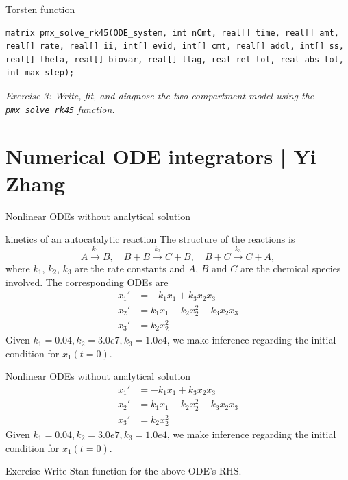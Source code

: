 \documentclass[presentation, allowframebreaks]{beamer}
\begin{document}
\begin{frame}[fragile,label={sec:org101ff93}]{Torsten function}
 \begin{verbatim}
matrix pmx_solve_rk45(ODE_system, int nCmt, real[] time, real[] amt, real[] rate, real[] ii, int[] evid, int[] cmt, real[] addl, int[] ss, real[] theta, real[] biovar, real[] tlag, real rel_tol, real abs_tol, int max_step);
\end{verbatim}
\emph{\textcolor{MRGGreen}{Exercise 3}: Write, fit, and diagnose the two compartment model using the \texttt{pmx\_solve\_rk45} function.}
\end{frame}

\section{Numerical ODE integrators | \footnotesize{Yi Zhang}}
\label{sec:orgcd8fdf4}
\label{org575bd5d}
\begin{frame}[label={sec:org028bc6a}]{Nonlinear ODEs without analytical solution}
\begin{block}{kinetics of an autocatalytic reaction \cite{robertson_numerical_1966}}
The structure of the reactions is 
\begin{equation*}
A \xrightarrow{k_1} B,\quad
B+B \xrightarrow{k_2} C + B,\quad
B+C \xrightarrow{k_3} C + A,
\end{equation*}
where \(k_1\), \(k_2\), \(k_3\) are the rate
constants and \(A\), \(B\) and \(C\) are the chemical species
involved. The corresponding ODEs are
\begin{align*}
x_1' &= -k_1x_1 + k_3x_2x_3\\
x_2' &=  k_1x_1 - k_2x_2^2 - k_3x_2x_3\\
x_3' &=  k_2x_2^2
\end{align*}
Given \(k_1=0.04, k_2=3.0e7, k_3=1.0e4\), we make inference
regarding the initial condition for \(x_1(t=0)\).
\end{block}
\end{frame}
\begin{frame}[label={sec:orgc85afde}]{Nonlinear ODEs without analytical solution}
\begin{align*}
x_1' &= -k_1x_1 + k_3x_2x_3\\
x_2' &=  k_1x_1 - k_2x_2^2 - k_3x_2x_3\\
x_3' &=  k_2x_2^2
\end{align*}
Given \(k_1=0.04, k_2=3.0e7, k_3=1.0e4\), we make inference
regarding the initial condition for \(x_1(t=0)\).
\begin{block}{Exercise}
Write Stan function for the above ODE's RHS.
\end{block}
\end{frame}
\end{document}
